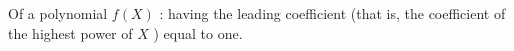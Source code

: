 Of a polynomial  $ f(X) $ : having the leading coefficient
(that is, the coefficient of the highest power of  $ X $ ) equal to
one.



